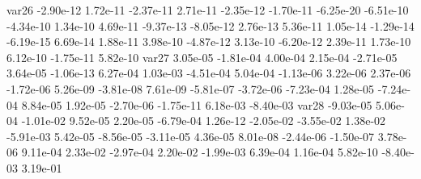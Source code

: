 var26 -2.90e-12  1.72e-11 -2.37e-11  2.71e-11 -2.35e-12 -1.70e-11 -6.25e-20 -6.51e-10 -4.34e-10  1.34e-10  4.69e-11 -9.37e-13 -8.05e-12  2.76e-13  5.36e-11  1.05e-14 -1.29e-14 -6.19e-15  6.69e-14  1.88e-11  3.98e-10 -4.87e-12  3.13e-10 -6.20e-12  2.39e-11  1.73e-10  6.12e-10 -1.75e-11  5.82e-10
var27  3.05e-05 -1.81e-04  4.00e-04  2.15e-04 -2.71e-05  3.64e-05 -1.06e-13  6.27e-04  1.03e-03 -4.51e-04  5.04e-04 -1.13e-06  3.22e-06  2.37e-06 -1.72e-06  5.26e-09 -3.81e-08  7.61e-09 -5.81e-07 -3.72e-06 -7.23e-04  1.28e-05 -7.24e-04  8.84e-05  1.92e-05 -2.70e-06 -1.75e-11  6.18e-03 -8.40e-03
var28 -9.03e-05  5.06e-04 -1.01e-02  9.52e-05  2.20e-05 -6.79e-04  1.26e-12 -2.05e-02 -3.55e-02  1.38e-02 -5.91e-03  5.42e-05 -8.56e-05 -3.11e-05  4.36e-05  8.01e-08 -2.44e-06 -1.50e-07  3.78e-06  9.11e-04  2.33e-02 -2.97e-04  2.20e-02 -1.99e-03  6.39e-04  1.16e-04  5.82e-10 -8.40e-03  3.19e-01


